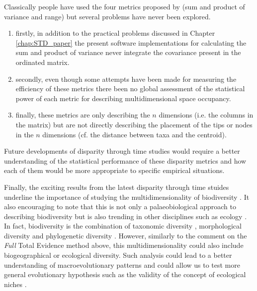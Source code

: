 Classically people have used the four metrics proposed by \cite{Wills1994} (sum and product of variance and range) but several problems have never been explored.
\begin{enumerate}
\item firstly, in addition to the practical problems discussed in Chapter \ref{chap:STD_paper} the present software implementations for calculating the sum and product of variance never integrate the covariance present in the ordinated matrix.
\item secondly, even though some attempts have been made for measuring the efficiency of these metrics \citep{Ciampaglio2001} there been no global assessment of the statistical power of each metric for describing multidimensional space occupancy.
\item finally, these metrics are only describing the $n$ dimensions (i.e. the columns in the matrix) but are not directly describing the placement of the tips or nodes in the $n$ dimensions (cf. the distance between taxa and the centroid). %
\end{enumerate}
Future developments of disparity through time studies would require a better understanding of the statistical performance of these disparity metrics and how each of them would be more appropriate to specific empirical situations. %

Finally, the exciting results from the latest disparity through time stuides underline the importance of studying the multidimensionality of biodiversity \citep[cf. just taxonomic richness;][]{Butler2012,brusattedinosaur2012,toljagictriassic-jurassic2013,brusattegradual2014,bensonfaunal2014,Claddis,Close2015}.
It also encouraging to note that this is not only a palaeobiological approach to describing biodiversity but is also trending in other disciplines such as ecology \citep{DonohueDim}.
In fact, biodiversity is the combination of taxonomic diversity \citep[e.g.][]{Stadler12042011}, morphological diversity \citep[from cladistics or morphometrics;][]{hetherington2015cladistic} and phylogenetic diversity \citep[e.g. the evolutionary rates regimes;][]{Close2015}. %
However, similarly to the comment on the \textit{Full} Total Evidence method above, this multidimensionality could also include biogeographical or ecological diversity.
Such analysis could lead to a better understanding of macroevolutionary patterns and could allow us to test more general evolutionary hypothesis such as the validity of the concept of ecological niches \citep{pearmanniche2008}. %

